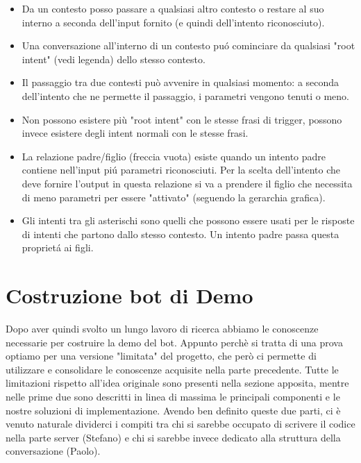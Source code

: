 \documentclass[]{article}
\begin{document}
\begin{itemize}
\item Da un contesto posso passare a qualsiasi altro contesto o restare al suo interno a seconda dell'input fornito (e quindi dell'intento riconosciuto).
\item Una conversazione all'interno di un contesto puó cominciare da qualsiasi "root intent" (vedi legenda) dello stesso contesto.
\item Il passaggio tra due contesti può avvenire in qualsiasi momento: a seconda dell'intento che ne permette il passaggio, i parametri vengono tenuti o meno. 
\item Non possono esistere più "root intent" con le stesse frasi di trigger, possono invece esistere degli intent normali con le stesse frasi.
\item La relazione padre/figlio (freccia vuota) esiste quando un intento padre contiene nell'input piú parametri riconosciuti. Per la scelta dell'intento che deve fornire l'output in questa relazione si va a prendere il figlio che necessita di meno parametri per essere "attivato" (seguendo la gerarchia grafica).
\item Gli intenti tra gli asterischi sono quelli che possono essere usati per le risposte di intenti che partono dallo stesso contesto. Un intento padre passa questa proprietá ai figli.


\end{itemize}





\section{Costruzione bot di Demo}
Dopo aver quindi svolto un lungo lavoro di ricerca abbiamo le conoscenze necessarie per costruire la demo del bot. Appunto perchè si tratta di una prova optiamo per una versione "limitata" del progetto, che però ci permette di utilizzare e consolidare le conoscenze acquisite nella parte precedente. Tutte le limitazioni rispetto all'idea originale sono presenti nella sezione apposita, mentre nelle prime due sono descritti in linea di massima le principali componenti e le nostre soluzioni di implementazione. Avendo ben definito queste due parti, ci è venuto naturale dividerci i compiti tra chi si sarebbe occupato di scrivere il codice nella parte server (Stefano) e chi si sarebbe invece dedicato alla struttura della conversazione (Paolo).
\end{document}
